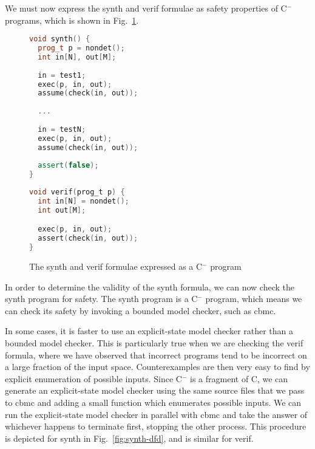 \documentclass[a4paper]{llncs}
\newcommand{\newC}{C$^-$\xspace}
\begin{document}
We must now express the {\sc synth} and {\sc verif} formulae as safety properties
of \newC programs, which is shown in Fig.~\ref{fig:c-synthverif}.

\begin{figure}
\centering
\begin{minipage}{0.45\textwidth}
\begin{lstlisting}[language=C++]
void synth() {
  prog_t p = nondet();
  int in[N], out[M];
  
  in = test1;
  exec(p, in, out);
  assume(check(in, out));
  
  ...
  
  in = testN;
  exec(p, in, out);
  assume(check(in, out));
  
  assert(false);
}
\end{lstlisting}
\end{minipage}
\begin{minipage}{0.45\textwidth}
\begin{lstlisting}[language=C]
void verif(prog_t p) {
  int in[N] = nondet();
  int out[M];

  exec(p, in, out);
  assert(check(in, out));
}
\end{lstlisting}
\end{minipage}

 \caption{The {\sc synth} and {\sc verif} formulae expressed as a \newC program}
 \label{fig:c-synthverif}
\end{figure}

In order to determine the validity of the {\sc synth} formula, we can now
check the {\sc synth} program for safety.  The {\sc synth} program is a
\newC program, which means we can check its safety by invoking a bounded
model checker, such as {\sc cbmc}.

In some cases, it is faster to use an explicit-state model checker rather
than a bounded model checker.  This is particularly true when we are checking
the {\sc verif} formula, where we have observed that incorrect programs tend
to be incorrect on a large fraction of the input space.  Counterexamples
are then very easy to find by explicit enumeration of possible inputs.
Since \newC is a fragment of C, we can generate an explicit-state
model checker using the same source files that we pass to {\sc cbmc}
and adding a small function which enumerates possible inputs.
We can run the explicit-state model checker
in parallel with {\sc cbmc} and take the answer of whichever happens
to terminate first, stopping the other process.  This procedure is
depicted for {\sc synth} in Fig.~\ref{fig:synth-dfd}, and is similar for {\sc verif}.
\end{document}
